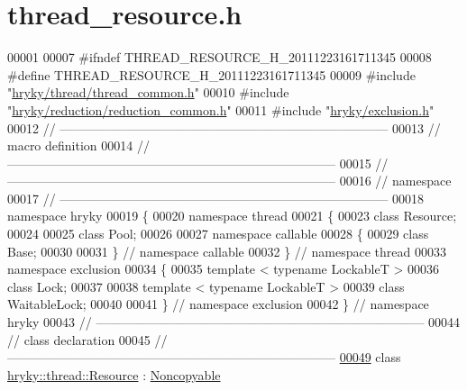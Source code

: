 \hypertarget{thread__resource_8h_source}{\section{thread\-\_\-resource.\-h}
}

\begin{DoxyCode}
00001 
00007 \textcolor{preprocessor}{#ifndef THREAD\_RESOURCE\_H\_20111223161711345}
00008 \textcolor{preprocessor}{}\textcolor{preprocessor}{#define THREAD\_RESOURCE\_H\_20111223161711345}
00009 \textcolor{preprocessor}{}\textcolor{preprocessor}{#include "\hyperlink{thread__common_8h}{hryky/thread/thread_common.h}"}
00010 \textcolor{preprocessor}{#include "\hyperlink{reduction__common_8h}{hryky/reduction/reduction_common.h}"}
00011 \textcolor{preprocessor}{#include "\hyperlink{exclusion_8h}{hryky/exclusion.h}"}
00012 \textcolor{comment}{//
      ------------------------------------------------------------------------------}
00013 \textcolor{comment}{// macro definition}
00014 \textcolor{comment}{//
      ------------------------------------------------------------------------------}
00015 \textcolor{comment}{//
      ------------------------------------------------------------------------------}
00016 \textcolor{comment}{// namespace}
00017 \textcolor{comment}{//
      ------------------------------------------------------------------------------}
00018 \textcolor{keyword}{namespace }hryky
00019 \{
00020 \textcolor{keyword}{namespace }thread
00021 \{
00023     \textcolor{keyword}{class }Resource;
00024 
00025     \textcolor{keyword}{class }Pool;
00026 
00027 \textcolor{keyword}{namespace }callable
00028 \{
00029     \textcolor{keyword}{class }Base;
00030     
00031 \} \textcolor{comment}{// namespace callable}
00032 \} \textcolor{comment}{// namespace thread}
00033 \textcolor{keyword}{namespace }exclusion
00034 \{
00035     \textcolor{keyword}{template} < \textcolor{keyword}{typename} LockableT >
00036     \textcolor{keyword}{class }Lock;
00037     
00038     \textcolor{keyword}{template} < \textcolor{keyword}{typename} LockableT >
00039     \textcolor{keyword}{class }WaitableLock;
00040     
00041 \} \textcolor{comment}{// namespace exclusion}
00042 \} \textcolor{comment}{// namespace hryky}
00043 \textcolor{comment}{//
      ------------------------------------------------------------------------------}
00044 \textcolor{comment}{// class declaration}
00045 \textcolor{comment}{//
      ------------------------------------------------------------------------------}
\hypertarget{thread__resource_8h_source_l00049}{}\hyperlink{classhryky_1_1thread_1_1_resource}{00049} \textcolor{comment}{}\textcolor{keyword}{class }\hyperlink{classhryky_1_1thread_1_1_resource}{hryky::thread::Resource} : \hyperlink{classhryky_1_1_noncopyable}{Noncopyable}

\end{DoxyCode}
